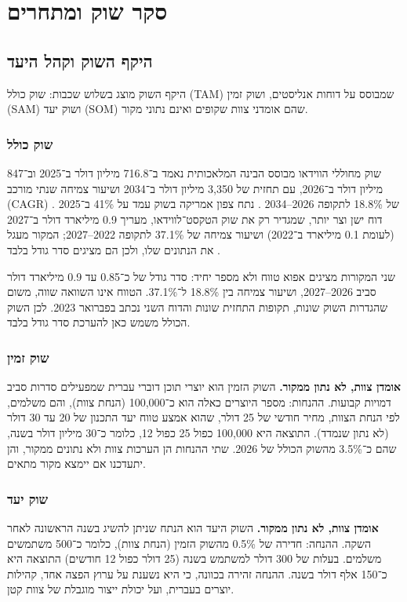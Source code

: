\chapter{סקר שוק ומתחרים}

\section{היקף השוק וקהל היעד}
היקף השוק מוצג בשלוש שכבות: שוק כולל (\textenglish{TAM}) שמבוסס על דוחות אנליסטים, ושוק זמין (\textenglish{SAM}) ושוק יעד (\textenglish{SOM}) שהם אומדני צוות שקופים ואינם נתוני מקור.

\subsection{שוק כולל}
שוק מחוללי הווידאו מבוסס הבינה המלאכותית נאמד ב־716.8 מיליון דולר ב־2025 וב־847 מיליון דולר ב־2026, עם תחזית של 3,350 מיליון דולר ב־2034 ושיעור צמיחה שנתי מורכב (\textenglish{CAGR}) של 18.8\% לתקופה \textenglish{2026–2034} \cite{fbi2026aivideo}. נתח צפון אמריקה בשוק עמד על 41\% ב־2025 \cite{fbi2026aivideo}. דוח ישן וצר יותר, שמגדיר רק את שוק הטקסט־לווידאו, מעריך 0.9 מיליארד דולר ב־2027 (לעומת 0.1 מיליארד ב־2022) ושיעור צמיחה של 37.1\% לתקופה \textenglish{2022–2027}; המקור מעגל את הנתונים שלו, ולכן הם מציגים סדר גודל בלבד \cite{mnm2023t2v}.

שני המקורות מציגים אפוא טווח ולא מספר יחיד: סדר גודל של כ־0.85 עד 0.9 מיליארד דולר סביב \textenglish{2026–2027}, ושיעור צמיחה בין 18.8\% ל־37.1\%. הטווח אינו השוואה שווה, משום שהגדרות השוק שונות, תקופות התחזית שונות והדוח השני נכתב בפברואר 2023. לכן השוק הכולל משמש כאן להערכת סדר גודל בלבד.

\subsection{שוק זמין}
\textbf{אומדן צוות, לא נתון ממקור.} השוק הזמין הוא יוצרי תוכן דוברי עברית שמפעילים סדרות סביב דמויות קבועות. ההנחות: מספר היוצרים כאלה הוא כ־100,000 (הנחת צוות), והם משלמים, לפי הנחת הצוות, מחיר חודשי של 25 דולר, שהוא אמצע טווח יעד התכנון של 20 עד 30 דולר (לא נתון שנמדד). התוצאה היא 100,000 כפול 25 כפול 12, כלומר כ־30 מיליון דולר בשנה, שהם כ־3.5\% מהשוק הכולל של 2026. שתי ההנחות הן הערכות צוות ולא נתונים ממקור, והן יתעדכנו אם יימצא מקור מתאים.

\subsection{שוק יעד}
\textbf{אומדן צוות, לא נתון ממקור.} השוק היעד הוא הנתח שניתן להשיג בשנה הראשונה לאחר השקה. ההנחה: חדירה של 0.5\% מהשוק הזמין (הנחת צוות), כלומר כ־500 משתמשים משלמים. בעלות של 300 דולר למשתמש בשנה (25 דולר כפול 12 חודשים) התוצאה היא כ־150 אלף דולר בשנה. ההנחה זהירה בכוונה, כי היא נשענת על ערוץ הפצה אחד, קהילות יוצרים בעברית, ועל יכולת ייצור מוגבלת של צוות קטן.

